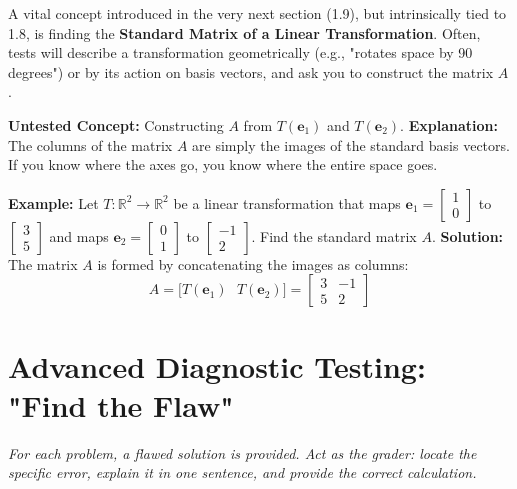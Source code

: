 \documentclass[11pt]{article}
\begin{document}
A vital concept introduced in the very next section (1.9), but intrinsically tied to 1.8, is finding the \textbf{Standard Matrix of a Linear Transformation}. Often, tests will describe a transformation geometrically (e.g., "rotates space by 90 degrees") or by its action on basis vectors, and ask you to construct the matrix $A$.

\textbf{Untested Concept:} Constructing $A$ from $T(\mathbf{e}_1)$ and $T(\mathbf{e}_2)$.
\textbf{Explanation:} The columns of the matrix $A$ are simply the images of the standard basis vectors. If you know where the axes go, you know where the entire space goes.

\textbf{Example:} Let $T: \mathbb{R}^2 \to \mathbb{R}^2$ be a linear transformation that maps $\mathbf{e}_1 = \begin{bmatrix} 1 \\ 0 \end{bmatrix}$ to $\begin{bmatrix} 3 \\ 5 \end{bmatrix}$ and maps $\mathbf{e}_2 = \begin{bmatrix} 0 \\ 1 \end{bmatrix}$ to $\begin{bmatrix} -1 \\ 2 \end{bmatrix}$. Find the standard matrix $A$.
\textbf{Solution:} 
The matrix $A$ is formed by concatenating the images as columns:
\[ A = \big[ T(\mathbf{e}_1) \ \ \ T(\mathbf{e}_2) \big] = \begin{bmatrix} 3 & -1 \\ 5 & 2 \end{bmatrix} \]

\section{Advanced Diagnostic Testing: "Find the Flaw"}
\textit{For each problem, a flawed solution is provided. Act as the grader: locate the specific error, explain it in one sentence, and provide the correct calculation.}
\end{document}

